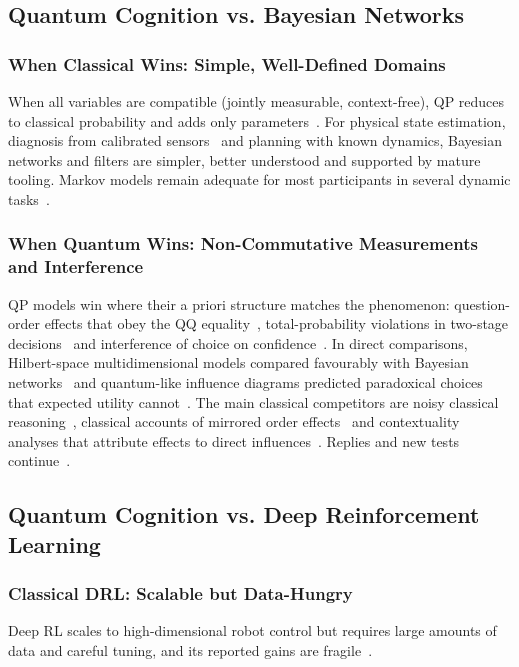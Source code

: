 \documentclass[pdflatex,sn-basic]{sn-jnl}
\begin{document}
\subsection{Quantum Cognition vs. Bayesian Networks}

\subsubsection{When Classical Wins: Simple, Well-Defined Domains}
When all variables are compatible (jointly measurable, context-free), QP reduces to classical probability and adds only parameters~\citep{Bruza2015}. For physical state estimation, diagnosis from calibrated sensors~\citep{Blanke2016} and planning with known dynamics, Bayesian networks and filters are simpler, better understood and supported by mature tooling. Markov models remain adequate for most participants in several dynamic tasks~\citep{Busemeyer2019,Epping2023}.

\subsubsection{When Quantum Wins: Non-Commutative Measurements and Interference}
QP models win where their a priori structure matches the phenomenon: question-order effects that obey the QQ equality~\citep{Wang2014}, total-probability violations in two-stage decisions~\citep{Pothos2009,Wang2016} and interference of choice on confidence~\citep{Kvam2015}. In direct comparisons, Hilbert-space multidimensional models compared favourably with Bayesian networks~\citep{Busemeyer2018} and quantum-like influence diagrams predicted paradoxical choices that expected utility cannot~\citep{Moreira2020b}. The main classical competitors are noisy classical reasoning~\citep{Costello2014,Costello2018}, classical accounts of mirrored order effects~\citep{Kellen2018} and contextuality analyses that attribute effects to direct influences~\citep{Dzhafarov2016b}. Replies and new tests continue~\citep{Busemeyer2017b,Basieva2019}.

\subsection{Quantum Cognition vs. Deep Reinforcement Learning}

\subsubsection{Classical DRL: Scalable but Data-Hungry}
Deep RL scales to high-dimensional robot control but requires large amounts of data and careful tuning, and its reported gains are fragile~\citep{Henderson2018}.
\end{document}
